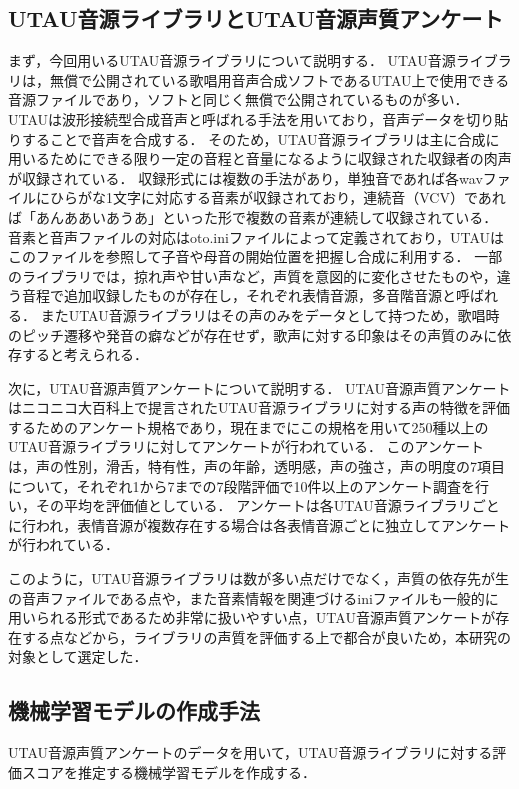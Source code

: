 \documentclass[a4j,8pt,twocolumn]{extarticle}
\begin{document}
\subsection{UTAU音源ライブラリとUTAU音源声質アンケート}
まず，今回用いるUTAU音源ライブラリについて説明する．
UTAU音源ライブラリは，無償で公開されている歌唱用音声合成ソフトであるUTAU上で使用できる音源ファイルであり，ソフトと同じく無償で公開されているものが多い．
UTAUは波形接続型合成音声と呼ばれる手法を用いており，音声データを切り貼りすることで音声を合成する．
そのため，UTAU音源ライブラリは主に合成に用いるためにできる限り一定の音程と音量になるように収録された収録者の肉声が収録されている．
収録形式には複数の手法があり，単独音であれば各wavファイルにひらがな1文字に対応する音素が収録されており，連続音（VCV）であれば「あんああいあうあ」\cite{tatsu3shiki}といった形で複数の音素が連続して収録されている．
音素と音声ファイルの対応はoto.iniファイルによって定義されており，UTAUはこのファイルを参照して子音や母音の開始位置を把握し合成に利用する．
一部のライブラリでは，掠れ声や甘い声など，声質を意図的に変化させたものや，違う音程で追加収録したものが存在し，それぞれ表情音源，多音階音源と呼ばれる．
またUTAU音源ライブラリはその声のみをデータとして持つため，歌唱時のピッチ遷移や発音の癖などが存在せず，歌声に対する印象はその声質のみに依存すると考えられる．

次に，UTAU音源声質アンケート\cite{utausurvey}について説明する．
UTAU音源声質アンケートはニコニコ大百科上で提言されたUTAU音源ライブラリに対する声の特徴を評価するためのアンケート規格であり，現在までにこの規格を用いて250種以上のUTAU音源ライブラリに対してアンケートが行われている．
このアンケートは，声の性別，滑舌，特有性，声の年齢，透明感，声の強さ，声の明度の7項目について，それぞれ1から7までの7段階評価で10件以上のアンケート調査を行い，その平均を評価値としている．
アンケートは各UTAU音源ライブラリごとに行われ，表情音源が複数存在する場合は各表情音源ごとに独立してアンケートが行われている．

このように，UTAU音源ライブラリは数が多い点だけでなく，声質の依存先が生の音声ファイルである点や，また音素情報を関連づけるiniファイルも一般的に用いられる形式であるため非常に扱いやすい点，UTAU音源声質アンケートが存在する点などから，ライブラリの声質を評価する上で都合が良いため，本研究の対象として選定した．

\subsection{機械学習モデルの作成手法}
UTAU音源声質アンケートのデータを用いて，UTAU音源ライブラリに対する評価スコアを推定する機械学習モデルを作成する．
\end{document}
